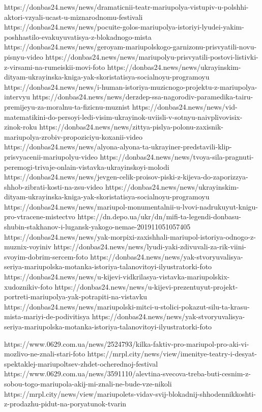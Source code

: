 https://donbas24.news/news/dramaticnii-teatr-mariupolya-vistupiv-u-polshhi-aktori-vzyali-ucast-u-miznarodnomu-festivali
https://donbas24.news/news/pocuite-golos-mariupolya-istoriyi-lyudei-yakim-poshhastilo-evakuyuvatisya-z-blokadnogo-mista
https://donbas24.news/news/geroyam-mariupolskogo-garnizonu-prisvyatili-novu-pisnyu-video
https://donbas24.news/news/mariupolyu-prisvyatili-postovi-listivki-z-virsami-na-rumeiskii-movi-foto
https://donbas24.news/news/ukrayinskim-dityam-ukrayinska-kniga-yak-skoristatisya-socialnoyu-programoyu
https://donbas24.news/news/i-human-istoriya-muzicnogo-projektu-z-mariupolya-intervyu
https://donbas24.news/news/derzdep-ssa-nagorodiv-paramedika-tairu-premijeyu-za-moralnu-ta-fizicnu-muznist
https://donbas24.news/news/vid-matematikini-do-persoyi-ledi-visim-ukrayinok-uviisli-v-sotnyu-naivplivovisix-zinok-roku
https://donbas24.news/news/zittya-pislya-polonu-zaxisnik-mariupolya-zrobiv-propoziciyu-koxanii-video
https://donbas24.news/news/alyona-alyona-ta-ukrayiner-predstavili-klip-prisvyacenii-mariupolyu-video
https://donbas24.news/news/tvoya-sila-pragnuti-peremogi-trivaje-onlain-vistavka-ukrayinskoyi-molodi
https://donbas24.news/news/jevgen-celik-proisov-piski-z-kijeva-do-zaporizzya-shhob-zibrati-kosti-na-zsu-video
https://donbas24.news/news/ukrayinskim-dityam-ukrayinska-kniga-yak-skoristatisya-socialnoyu-programoyu
https://donbas24.news/news/mariupol-monumentalnii-u-lvovi-nadrukuyut-knigu-pro-vtracene-mistectvo
https://dn.depo.ua/ukr/dn/mifi-ta-legendi-donbasu-shubin-stakhanov-i-lugansk-yakogo-nemae-201911051057405
https://donbas24.news/news/yak-morpixi-zaxishhali-mariupol-istoriya-odnogo-z-muznix-voyiniv
https://donbas24.news/news/lyudi-yaki-zdivuvali-za-rik-viini-svoyim-dobrim-sercem-foto
https://donbas24.news/news/yak-stvoryuvalisya-seriya-mariupolska-motanka-istoriya-talanovitoyi-ilyustratorki-foto
https://donbas24.news/news/u-kijevi-vidkrilasya-vistavka-mariupolskix-xudoznikiv-foto
https://donbas24.news/news/u-kijevi-prezentuyut-projekt-portreti-mariupolya-yak-potrapiti-na-vistavku
https://donbas24.news/news/mariupolski-mitci-u-stolici-pokazut-silu-ta-krasu-mista-mariyi-de-podivitisya
https://donbas24.news/news/yak-stvoryuvalisya-seriya-mariupolska-motanka-istoriya-talanovitoyi-ilyustratorki-foto

% 
https://www.0629.com.ua/news/2524793/kilka-faktiv-pro-mariupol-pro-aki-vi-mozlivo-ne-znali-stari-foto
https://mrpl.city/news/view/imenitye-teatry-i-desyat-spektaklej-mariupoltsev-zhdet-ocherednoj-festival
https://www.0629.com.ua/news/3591110/alevtina-svecova-treba-buti-cesnim-z-sobou-togo-mariupola-akij-mi-znali-ne-bude-vze-nikoli
https://mrpl.city/news/view/mariupolets-vidav-svij-blokadnij-shhodennikkoshti-z-prodazhu-pidut-na-poryatunok-tvarin

